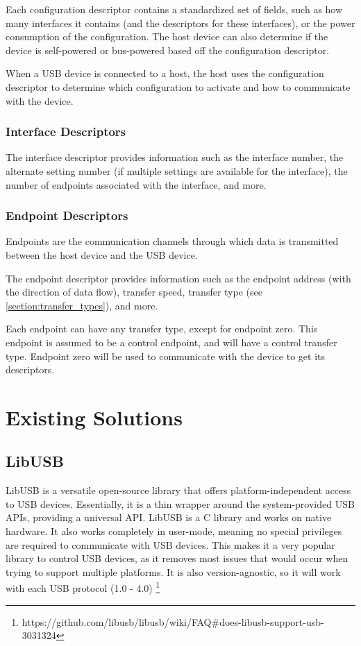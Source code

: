 Each configuration descriptor contains a standardized set of fields, such as how many interfaces it contains (and the descriptors for these interfaces), or the power consumption of the configuration. The host device can also determine if the device is self-powered or bus-powered based off the configuration descriptor.

When a USB device is connected to a host, the host uses the configuration descriptor to determine which configuration to activate and how to communicate with the device.

\subsubsection{Interface Descriptors}

The interface descriptor provides information such as the interface number, the alternate setting number (if multiple settings are available for the interface), the number of endpoints associated with the interface, and more.

\subsubsection{Endpoint Descriptors}

Endpoints are the communication channels through which data is transmitted between the host device and the USB device.

The endpoint descriptor provides information such as the endpoint address (with the direction of data flow), transfer speed, transfer type (see \ref{section:transfer_types}), and more.

Each endpoint can have any transfer type, except for endpoint zero. This endpoint is assumed to be a control endpoint, and will have a control transfer type. Endpoint zero will be used to communicate with the device to get its descriptors.

\section{Existing Solutions}

\subsection{LibUSB}
LibUSB \cite{LibUSB} is a versatile open-source library that offers platform-independent access to USB devices. Essentially, it is a thin wrapper around the system-provided USB APIs, providing a universal API. LibUSB is a C library and works on native hardware. It also works completely in user-mode, meaning no special privileges are required to communicate with USB devices. This makes it a very popular library to control USB devices, as it removes most issues that would occur when trying to support multiple platforms. It is also version-agnostic, so it will work with each USB protocol (1.0 - 4.0) \footnote{https://github.com/libusb/libusb/wiki/FAQ\#does-libusb-support-usb-3031324}

